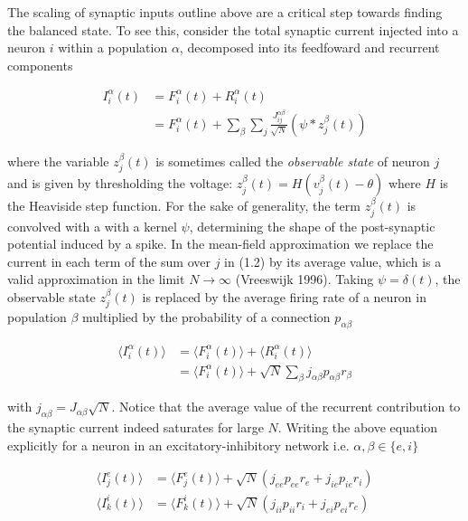 \documentclass{ucetd}
\begin{document}
The scaling of synaptic inputs outline above are a critical step towards finding the balanced state. To see this, consider the total synaptic current injected into a neuron $i$ within a population $\alpha$, decomposed into its feedfoward and recurrent components

\begin{align}
I_{i}^{\alpha}(t) &= F_{i}^{\alpha}(t) + R_{i}^{\alpha}(t)\\
&= F_{i}^{\alpha}(t) + \sum_{\beta}\sum_{j} \frac{J_{ij}^{\alpha\beta}}{\sqrt{N}}(\psi * z^{\beta}_{j}(t))
\end{align}

where the variable $z^{\beta}_{j}(t)$ is sometimes called the \emph{observable state} of neuron $j$ and is given by thresholding the voltage: $z^{\beta}_{j}(t) = H(v^{\beta}_{j}(t) - \theta)$ where $H$ is the Heaviside step function. For the sake of generality, the term $z^{\beta}_{j}(t)$ is convolved with a with a kernel $\psi$, determining the shape of the post-synaptic potential induced by a spike. In the mean-field approximation we replace the current in each term of the sum over $j$ in (1.2) by its average value, which is a valid approximation in the limit $N\rightarrow\infty$ (Vreeswijk 1996). Taking $\psi = \delta(t)$, the observable state $z^{\beta}_{j}(t)$ is replaced by the average firing rate of a neuron in population $\beta$ multiplied by the probability of a connection $p_{\alpha\beta}$

\begin{align*}
\langle I_{i}^{\alpha}(t)\rangle &= \langle F_{i}^{\alpha}(t)\rangle + \langle R_{i}^{\alpha}(t)\rangle\\
&= \langle F_{i}^{\alpha}(t)\rangle + \sqrt{N}\sum_{\beta}j_{\alpha\beta}p_{\alpha\beta}r_{\beta}
\end{align*}

with $j_{\alpha\beta} = J_{\alpha\beta}\sqrt{N}$. Notice that the average value of the recurrent contribution to the synaptic current indeed saturates for large $N$. Writing the above equation explicitly for a neuron in an excitatory-inhibitory network i.e. $\alpha, \beta \in \{e, i\}$

\begin{align}
\langle I_{j}^{e}(t)\rangle &= \langle F_{j}^{e}(t)\rangle + \sqrt{N}\left(j_{ee}p_{ee}r_{e} + j_{ie}p_{ie}r_{i}\right)\\
\langle I_{k}^{i}(t)\rangle &= \langle F_{k}^{i}(t)\rangle + \sqrt{N}\left(j_{ii}p_{ii}r_{i} + j_{ei}p_{ei}r_{e}\right)
\end{align}
\end{document}
